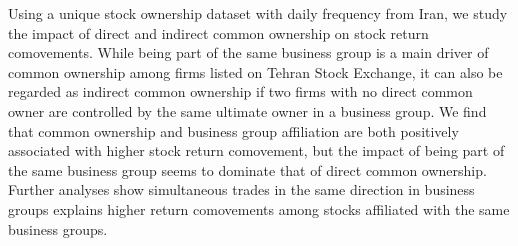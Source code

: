 Using a unique stock ownership dataset with daily frequency from Iran, we study the impact of direct and indirect common ownership on stock return comovements. While being part of the same business group is a main driver of common ownership among firms listed on Tehran Stock Exchange, it can also be regarded as indirect common ownership if two firms with no direct common owner are controlled by the same ultimate owner in a business group. We find that common ownership and business group affiliation are both positively associated with higher stock return comovement, but the impact of being part of the same business group seems to dominate that of direct common ownership. Further analyses show simultaneous trades in the same direction in business groups explains higher return comovements among stocks affiliated with the same business groups.
